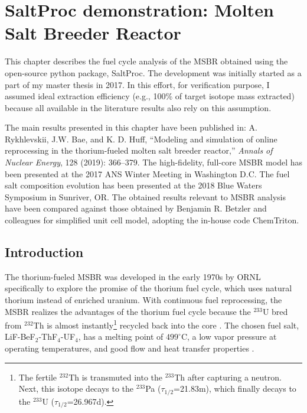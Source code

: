 \chapter[Tool demonstration: Molten Salt Breeder Reactor]{SaltProc 
demonstration: Molten Salt Breeder Reactor}

This chapter describes the fuel cycle analysis of the \gls{MSBR} obtained 
using the open-source python package, SaltProc. The development was initially 
started as a part of my master thesis \cite{rykhlevskii_advanced_2018} in 
2017.  In this effort, for verification purpose, I assumed ideal extraction 
efficiency (e.g., 100\% of target isotope mass extracted) because all 
available in the literature results also rely on this assumption.

The main results presented in this chapter have been published in: A. 
Rykhlevskii, J.W. Bae, and K. D. Huff, ``Modeling and simulation of online 
reprocessing in the thorium-fueled molten salt breeder reactor,'' 
\textit{Annals of Nuclear Energy}, 128 (2019): 366--379. The high-fidelity, 
full-core \gls{MSBR} model has been presented at the 2017 \gls{ANS} Winter 
Meeting in Washington D.C. The fuel salt composition evolution has been 
presented at the 2018 Blue Waters Symposium in Sunriver, OR. The obtained 
results relevant to \gls{MSBR} analysis have been compared against those 
obtained by Benjamin R. Betzler and colleagues for simplified unit cell model, 
adopting the in-house code ChemTriton. 


\section{Introduction}
The thorium-fueled \gls{MSBR} was developed in the early 1970s by \gls{ORNL} 
specifically to explore the promise of the thorium fuel cycle, which uses 
natural thorium instead of enriched uranium. With continuous fuel 
reprocessing, the \gls{MSBR} realizes the advantages of the thorium fuel cycle 
because the $^{233}$U bred from $^{232}$Th is almost instantly\footnote{\space 
The fertile $^{232}$Th is transmuted into the $^{233}$Th after capturing a 
neutron. Next, this isotope decays to the $^{233}$Pa ($\tau_{1/2}$=21.83m), 
which finally decays to the $^{233}$U ($\tau_{1/2}$=26.967d).} recycled back 
into the core  \cite{betzler_modeling_2016}. The chosen fuel salt, 
LiF-BeF$_2$-ThF$_4$-UF$_4$, has a melting point of $499^\circ$C, a low vapor 
pressure at operating temperatures, and good flow and heat transfer properties 
\cite{robertson_conceptual_1971}. 

